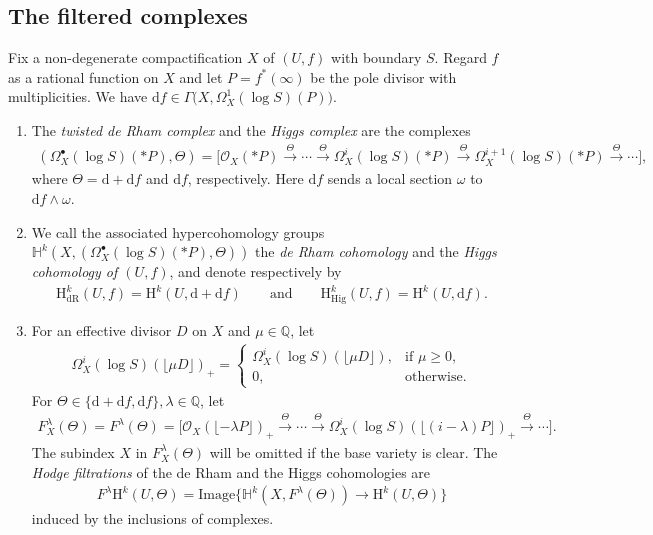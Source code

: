 \documentclass[pdftex]{sigma}
\newcommand{\HH}{\mathbb{H}}
\newcommand{\QQ}{\mathbb{Q}}
\newcommand{\sO}{\mathscr{O}}
\newcommand{\de}{\mathrm{d}}
\newcommand{\dR}{\mathrm{dR}}
\newcommand{\Hig}{\mathrm{Hig}}
\newcommand{\coH}{\mathrm{H}}
\newcommand{\ddRH}{\Theta}
\newcommand{\cpt}{compactification}
\newcommand{\flr}[1]{\lfloor #1 \rfloor}
\begin{document}
\subsection{The filtered complexes}
Fix a non-degenerate {\cpt} $X$ of $(U,f)$ with boundary $S$. Regard $f$ as a rational function on $X$ and let $P = f^*(\infty)$ be the pole divisor with multiplicities. We have $\de f \in \Gamma\big(X,\Omega_X^1(\log S)(P)\big)$.

\begin{definition*}\quad\begin{enumerate}\itemsep=0pt
\item[(i)] The \textit{twisted de Rham complex} and the \textit{Higgs complex} are the complexes
\begin{gather*}
(\Omega_X^\bullet(\log S)(*P), \ddRH) = \big[ \sO_X(*P) \!\xrightarrow{\ddRH} \!\cdots\! \xrightarrow{\ddRH} \! \Omega_X^i(\log S)(*P) \!\xrightarrow{\ddRH}\! \Omega_X^{i+1}(\log S)(*P)\xrightarrow{\ddRH}\!\cdots \big],
\end{gather*}
where $\ddRH = \de + \de f$ and $\de f$, respectively. Here $\de f$ sends a local section $\omega$ to $\de f\wedge \omega$.

\item[(ii)] We call the associated hypercohomology groups $\HH^k(X,(\Omega_X^\bullet(\log S)(*P), \ddRH))$ the \textit{de Rham cohomology} and the \textit{Higgs cohomology of $(U,f)$}, and denote respectively by
\begin{gather*} \coH_\dR^k(U,f) = \coH^k(U,\de +\de f) \qquad\text{and}\qquad \coH_\Hig^k(U,f) = \coH^k(U,\de f). \end{gather*}

\item[(iii)] For an effective divisor $D$ on $X$ and $\mu\in\QQ$, let
\begin{gather*} \Omega_X^i(\log S)(\flr{\mu D})_+ = \begin{cases}
\Omega_X^i(\log S)(\flr{\mu D}), & \text{if $\mu\geq 0$}, \\
0, & \text{otherwise}.
\end{cases} \end{gather*}
For $\ddRH \in \{\de +\de f, \de f\}, \lambda \in \QQ$, let
\begin{gather*} F_X^\lambda(\ddRH) = F^\lambda(\ddRH) =
\big[ \sO_X(\flr{-\lambda P})_+ \xrightarrow{\ddRH} \cdots \xrightarrow{\ddRH} \Omega_X^i(\log S)(\flr{(i-\lambda)P})_+ \xrightarrow{\ddRH} \cdots \big]. \end{gather*}
The subindex $X$ in $F_X^\lambda(\ddRH)$ will be omitted if the base variety is clear. The \textit{Hodge filtrations} of the de Rham and the Higgs cohomologies are \begin{gather}\label{eq:H-fil}
F^\lambda\coH^k(U,\ddRH) = \mathrm{Image}\big\{ \HH^k(X,F^\lambda(\ddRH)) \to \coH^k(U,\ddRH) \big\}
\end{gather}
induced by the inclusions of complexes.


\end{enumerate}
\end{definition*}
\end{document}
